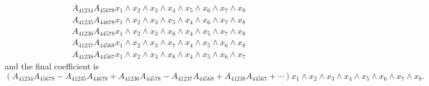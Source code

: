 \documentclass[aps, preprint]{revtex4}
\begin{document}
\begin{align} & A_{4 1 2 3 4} A_{4 5 6 7 8} x_{1} \wedge x_{2} \wedge x_{3} \wedge x_{4} \wedge x_{5} \wedge x_{6} \wedge x_{7} \wedge x_{8} \nonumber  \\
 & A_{4 1 2 3 5} A_{4 4 6 7 8} x_{1} \wedge x_{2} \wedge x_{3} \wedge x_{5} \wedge x_{4} \wedge x_{6} \wedge x_{7} \wedge x_{8} \nonumber  \\
 & A_{4 1 2 3 6} A_{4 4 5 7 8} x_{1} \wedge x_{2} \wedge x_{3} \wedge x_{6} \wedge x_{4} \wedge x_{5} \wedge x_{7} \wedge x_{8} \nonumber  \\
 & A_{4 1 2 3 7} A_{4 4 5 6 8} x_{1} \wedge x_{2} \wedge x_{3} \wedge x_{7} \wedge x_{4} \wedge x_{5} \wedge x_{6} \wedge x_{8} \nonumber  \\
 & A_{4 1 2 3 8} A_{4 4 5 6 7} x_{1} \wedge x_{2} \wedge x_{3} \wedge x_{8} \wedge x_{4} \wedge x_{5} \wedge x_{6} \wedge x_{7}\end{align}and the final coefficient is
\begin{equation}\left (A_{4 1 2 3 4} A_{4 5 6 7 8} -A_{4 1 2 3 5} A_{4 4 6 7 8} +A_{4 1 2 3 6} A_{4 4 5 7 8} -A_{4 1 2 3 7} A_{4 4 5 6 8} +A_{4 1 2 3 8} A_{4 4 5 6 7} +\cdots \right ) x_{1} \wedge x_{2} \wedge x_{3} \wedge x_{4} \wedge x_{5} \wedge x_{6} \wedge x_{7} \wedge x_{8}\text{.}
\end{equation}
\end{document}
